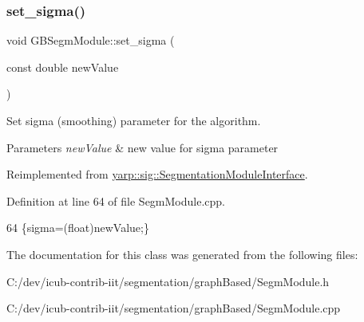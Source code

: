 \subsubsection{\texorpdfstring{set\+\_\+sigma()}{set\_sigma()}}
{\footnotesize\ttfamily void G\+B\+Segm\+Module\+::set\+\_\+sigma (\begin{DoxyParamCaption}\item[{const double}]{new\+Value }\end{DoxyParamCaption})\hspace{0.3cm}{\ttfamily [virtual]}}



Set sigma (smoothing) parameter for the algorithm. 


\begin{DoxyParams}{Parameters}
{\em new\+Value} & new value for sigma parameter \\
\hline
\end{DoxyParams}


Reimplemented from \hyperlink{classyarp_1_1sig_1_1SegmentationModuleInterface_a68f28930df5e930934c0ee56ad1f680c}{yarp\+::sig\+::\+Segmentation\+Module\+Interface}.



Definition at line 64 of file Segm\+Module.\+cpp.


\begin{DoxyCode}
64 \{sigma=(float)newValue;\}
\end{DoxyCode}


The documentation for this class was generated from the following files\+:\begin{DoxyCompactItemize}
\item 
C\+:/dev/icub-\/contrib-\/iit/segmentation/graph\+Based/Segm\+Module.\+h\item 
C\+:/dev/icub-\/contrib-\/iit/segmentation/graph\+Based/Segm\+Module.\+cpp\end{DoxyCompactItemize}
